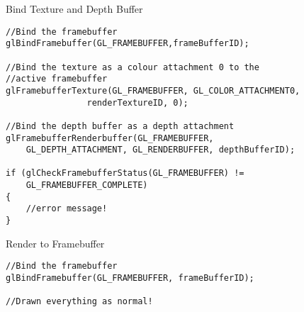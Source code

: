 \begin{frame}[fragile]{Bind Texture and Depth Buffer}
	\begin{lstlisting}
//Bind the framebuffer
glBindFramebuffer(GL_FRAMEBUFFER,frameBufferID);

//Bind the texture as a colour attachment 0 to the
//active framebuffer
glFramebufferTexture(GL_FRAMEBUFFER, GL_COLOR_ATTACHMENT0,
				renderTextureID, 0);

//Bind the depth buffer as a depth attachment
glFramebufferRenderbuffer(GL_FRAMEBUFFER,
	GL_DEPTH_ATTACHMENT, GL_RENDERBUFFER, depthBufferID);

if (glCheckFramebufferStatus(GL_FRAMEBUFFER) !=
	GL_FRAMEBUFFER_COMPLETE)
{
	//error message!
}
	\end{lstlisting}
\end{frame}


\begin{frame}[fragile]{Render to Framebuffer}
	\begin{lstlisting}
//Bind the framebuffer
glBindFramebuffer(GL_FRAMEBUFFER, frameBufferID);

//Drawn everything as normal!
	\end{lstlisting}
\end{frame}
